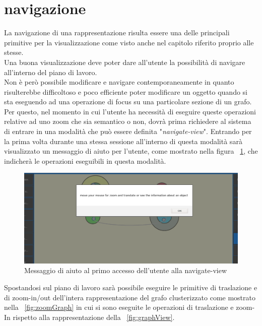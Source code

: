 {\section{navigazione}
La navigazione di una rappresentazione risulta essere una delle principali primitive per la visualizzazione come visto anche nel capitolo riferito proprio alle stesse.\\
Una buona visualizzazione deve poter dare all'utente la possibilità di navigare all'interno del piano di lavoro.\\
Non è però possibile modificare e navigare contemporaneamente in quanto risulterebbe difficoltoso e poco efficiente poter modificare un oggetto quando si sta eseguendo ad una operazione di focus su una particolare sezione di un grafo. Per questo, nel momento in cui l'utente ha necessità di eseguire queste operazioni relative ad uno zoom che sia semantico o non, dovrà prima richiedere al sistema di entrare in una modalità che può essere definita "\textit{navigate-view}". Entrando per la prima volta durante una stessa sessione all'interno di questa modalità sarà visualizzato un messaggio di aiuto per l'utente, come mostrato nella figura \figurename~\ref{fig:navMessage}, che indicherà le operazioni eseguibili in questa modalità.\\
\begin{figure}[!htb]
	\begin{center}
		\includegraphics[width=1 \linewidth]{figure/navMessage}
	\end{center}
	\caption{Messaggio di aiuto al primo accesso dell'utente alla navigate-view\label{fig:navMessage}}
\end{figure}
\newline
Spostandosi sul piano di lavoro sarà possibile eseguire le primitive di traslazione e di zoom-in/out dell'intera rappresentazione del grafo clusterizzato come mostrato nella \figurename~\ref{fig:zoomGraph} in cui si sono eseguite le operazioni di traslazione e zoom-In rispetto alla rappresentazione della \figurename~\ref{fig:graphView}.
}

